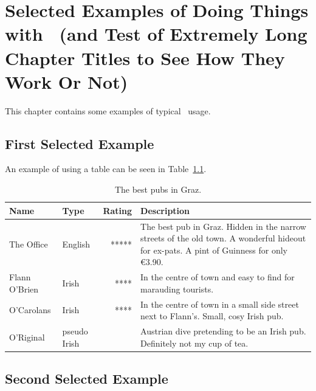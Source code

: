 %
%
% 
% 
% 

\chapter{Selected Examples of Doing Things with \LaTeXe\
(and Test of Extremely
Long Chapter Titles to See How They Work Or Not)
}

\label{chap:SelectedExamples}


This chapter contains some examples of typical \LaTeXe\
usage.




\section{First Selected Example}

An example of using a table can be seen in Table~\ref{tabBestPubs}.

\begin{table}[tp]
\centering
\begin{tabular}{|llrp{10cm}|}
\hline
Name & Type & Rating & Description \\
\hline
The Office &
English &
***** &
The best pub in Graz. Hidden in the narrow streets
of the old town. A wonderful hideout for ex-pats.
A pint of Guinness for only \euro 3.90.
\\
\hline
Flann O'Brien &
Irish &
**** &
In the centre of town and easy to find for
marauding tourists.
\\
\hline
O'Carolans &
Irish &
**** &
In the centre of town in a small side street next to Flann's.
Small, cosy Irish pub.
\\
\hline
O'Riginal &
pseudo Irish &
 &
Austrian dive pretending to be an Irish pub.
Definitely not my cup of tea.
\\
\hline
\end{tabular}

\caption[Best Pubs in Graz]
{
The best pubs in Graz.
}
\label{tabBestPubs}
\end{table}





\section{Second Selected Example}

